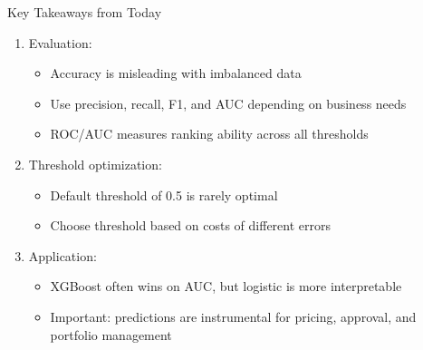 \documentclass[10pt]{beamer}
\begin{document}
\begin{frame}{Key Takeaways from Today}

  \begin{enumerate}
      \item Evaluation:
  \begin{itemize}
    \item Accuracy is misleading with imbalanced data
    \item Use precision, recall, F1, and AUC depending on business needs
    \item ROC/AUC measures ranking ability across all thresholds
  \end{itemize}
    \vspace{0.3em}

\item Threshold optimization:
  \begin{itemize}
    \item Default threshold of 0.5 is rarely optimal
    \item Choose threshold based on costs of different errors
  \end{itemize}
  \vspace{0.3em}

\item Application:
  \begin{itemize}
    \item XGBoost often wins on AUC, but logistic is more interpretable
    \item Important: predictions are instrumental for pricing, approval, and portfolio management
  \end{itemize}
  \end{enumerate}

\end{frame}

\end{document}
